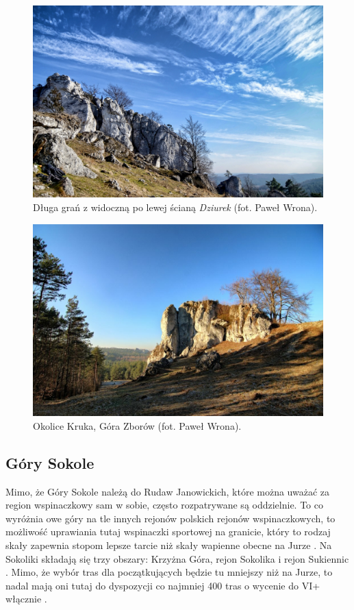 \documentclass{article}
\begin{document}
\begin{figure}[!htbp]
	\begin{center}
		\includegraphics[width=0.75\linewidth]{images/jura-gora-zborow.eps}
	\end{center}
	\caption{Długa grań z widoczną po lewej ścianą \textit{Dziurek} (fot. Paweł Wrona)\cite{jura-gora-zborow}.}
	\label{zborow}
\end{figure}

\begin{figure}[!htbp]
	\begin{center}
		\includegraphics[width=0.75\linewidth]{images/jura-gora-zborow-2.eps}
	\end{center}
	\caption{Okolice Kruka, Góra Zborów (fot. Paweł Wrona)\cite{jura-gora-zborow}.}
	\label{}
\end{figure}

\subsection{Góry Sokole}
Mimo, że Góry Sokole należą do Rudaw Janowickich, które można uważać za region wspinaczkowy sam w sobie, często rozpatrywane są oddzielnie. To co wyróżnia owe góry na tle innych rejonów polskich rejonów wspinaczkowych, to możliwość uprawiania tutaj wspinaczki sportowej na granicie, który to rodzaj skały zapewnia stopom lepsze tarcie niż skały wapienne obecne na Jurze \cite{podroze-se-wspin}. Na Sokoliki składają się trzy obszary: Krzyżna Góra, rejon Sokolika i rejon Sukiennic \cite{eng-pol-wspin}. Mimo, że wybór tras dla początkujących będzie tu mniejszy niż na Jurze, to nadal mają oni tutaj do dyspozycji co najmniej 400 tras o wycenie do VI+ włącznie \cite{topo-sokoliki}.
\end{document}
